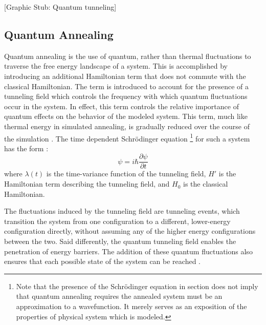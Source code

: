 \documentclass[11pt]{afthesis}
\begin{document}
	[Graphic Stub: Quantum tunneling] 
	
	
	\subsection{Quantum Annealing}
	
	Quantum annealing is the use of quantum, rather than thermal fluctuations to traverse the free energy landscape of a system. This is accomplished by introducing an additional Hamiltonian term that does not commute with the classical Hamiltonian. The term is introduced to account for the presence of a tunneling field which controls the frequency with which quantum fluctuations occur in the system. In effect, this term controls the relative importance of quantum effects on the behavior of the modeled system. This term, much like thermal energy in simulated annealing, is gradually reduced over the course of the simulation \cite{das2005qakcs}. The time dependent Schrödinger equation \footnote{Note that the presence of the Schrödinger equation in section does not imply that quantum annealing requires the annealed system must be an approximation to a wavefunction. It merely serves as an exposition of the properties of physical system which is modeled.} for such a system has the form \cite{mukherjee2015multivariatesearchqa}: \begin{equation}
	[\lambda(t)H' + H_0]\psi = i\hbar \frac{\partial \psi}{\partial t}
	\end{equation} where \begin{math} \lambda(t) \end{math} is the time-variance function of the tunneling field, \begin{math} H' \end{math} is the Hamiltonian term describing the tunneling field, and \begin{math} H_0 \end{math} is the classical Hamiltonian. 
	
	The fluctuations induced by the tunneling field are tunneling events, which transition the system from one configuration to a different, lower-energy configuration directly, without assuming any of the higher energy configurations between the two. Said differently, the quantum tunneling field enables the penetration of energy barriers. The addition of these quantum fluctuations also ensures that each possible state of the system can be reached \cite{das2005qakcs}. 
	
	
\end{document}

